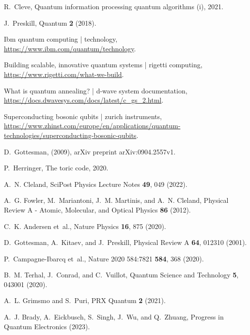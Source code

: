 \begin{thebibliography}{10}
    R.~Cleve,
    \newblock Quantum information processing quantum algorithms (i), 2021.
    
    J.~Preskill,
    \newblock Quantum {\bf 2} (2018).
    
    Ibm quantum computing | technology,
    \newblock \url{https://www.ibm.com/quantum/technology}.
    
    Building scalable, innovative quantum systems | rigetti computing,
    \newblock \url{https://www.rigetti.com/what-we-build}.
    
    What is quantum annealing? | d-wave system documentation,
    \newblock \url{https://docs.dwavesys.com/docs/latest/c_gs_2.html}.
    
    Superconducting bosonic qubits | zurich instruments,
    \newblock
      \url{https://www.zhinst.com/europe/en/applications/quantum-technologies/superconducting-bosonic-qubits}.
    
    D.~Gottesman,
    \newblock (2009),
    \newblock arXiv preprint arXiv:0904.2557v1.
    
    P.~Herringer,
    \newblock The toric code, 2020.
    
    A.~N. Cleland,
    \newblock SciPost Physics Lecture Notes {\bf 49}, 049 (2022).
    
    A.~G. Fowler, M.~Mariantoni, J.~M. Martinis, and A.~N. Cleland,
    \newblock Physical Review A - Atomic, Molecular, and Optical Physics {\bf 86} (2012).
    
    C.~K. Andersen et~al.,
    \newblock Nature Physics {\bf 16}, 875 (2020).
    
    D.~Gottesman, A.~Kitaev, and J.~Preskill,
    \newblock Physical Review A {\bf 64}, 012310 (2001).
    
    P.~Campagne-Ibarcq et~al.,
    \newblock Nature 2020 584:7821 {\bf 584}, 368 (2020).
    
    B.~M. Terhal, J.~Conrad, and C.~Vuillot,
    \newblock Quantum Science and Technology {\bf 5}, 043001 (2020).
    
    A.~L. Grimsmo and S.~Puri,
    \newblock PRX Quantum {\bf 2} (2021).
    
    A.~J. Brady, A.~Eickbusch, S.~Singh, J.~Wu, and Q.~Zhuang,
    \newblock Progress in Quantum Electronics  (2023).
    

\end{thebibliography}
